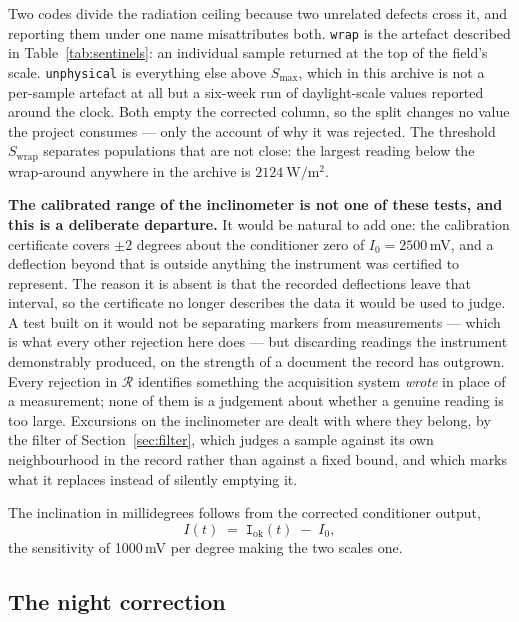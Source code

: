 \documentclass[11pt,a4paper]{article}
\begin{document}
Two codes divide the radiation ceiling because two unrelated defects cross it, and reporting them under one name misattributes both. \texttt{wrap} is the artefact described in Table~\ref{tab:sentinels}: an individual sample returned at the top of the field's scale. \texttt{unphysical} is everything else above $S_{\max}$, which in this archive is not a per-sample artefact at all but a six-week run of daylight-scale values reported around the clock. Both empty the corrected column, so the split changes no value the project consumes --- only the account of why it was rejected. The threshold $S_{\mathrm{wrap}}$ separates populations that are not close: the largest reading below the wrap-around anywhere in the archive is $2124\ \mathrm{W/m^2}$.

\textbf{The calibrated range of the inclinometer is not one of these tests, and this is a deliberate departure.} It would be natural to add one: the calibration certificate covers $\pm 2$ degrees about the conditioner zero of $I_0 = 2500$\,mV, and a deflection beyond that is outside anything the instrument was certified to represent. The reason it is absent is that the recorded deflections leave that interval, so the certificate no longer describes the data it would be used to judge. A test built on it would not be separating markers from measurements --- which is what every other rejection here does --- but discarding readings the instrument demonstrably produced, on the strength of a document the record has outgrown. Every rejection in $\mathcal{R}$ identifies something the acquisition system \emph{wrote} in place of a measurement; none of them is a judgement about whether a genuine reading is too large. Excursions on the inclinometer are dealt with where they belong, by the filter of Section~\ref{sec:filter}, which judges a sample against its own neighbourhood in the record rather than against a fixed bound, and which marks what it replaces instead of silently emptying it.

The inclination in millidegrees follows from the corrected conditioner output,
\begin{equation}
\label{eq:inc}
I(t) \;=\; \texttt{I}_{\mathrm{ok}}(t) \;-\; I_0 ,
\end{equation}
the sensitivity of 1000\,mV per degree making the two scales one.

\subsection{The night correction}
\label{sec:night}
\end{document}
